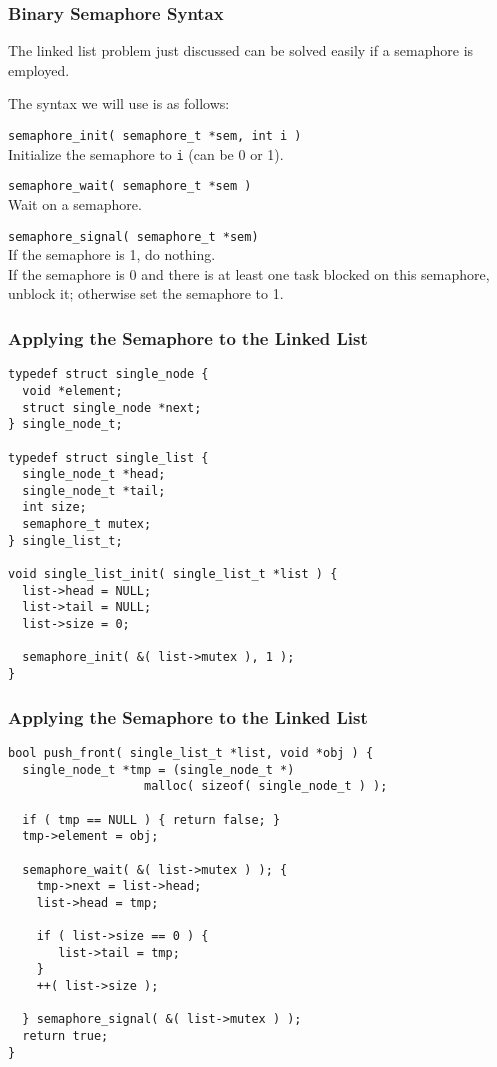 \begin{frame}
\frametitle{Binary Semaphore Syntax}

The linked list problem just discussed can be solved easily if a semaphore is employed. 

The syntax we will use is as follows:

\texttt{semaphore\_init( semaphore\_t *sem, int i )}\\
Initialize the semaphore to \texttt{i} (can be 0 or 1).

\texttt{semaphore\_wait( semaphore\_t *sem )}\\
Wait on a semaphore.

\texttt{semaphore\_signal( semaphore\_t *sem)}\\
If the semaphore is 1, do nothing.\\
If the semaphore is 0 and there is at least one task blocked on this semaphore, unblock it; otherwise set the semaphore to 1.

\end{frame}

\begin{frame}[fragile]
\frametitle{Applying the Semaphore to the Linked List}

\begin{verbatim}
typedef struct single_node {
  void *element;
  struct single_node *next;
} single_node_t;

typedef struct single_list {
  single_node_t *head;
  single_node_t *tail;
  int size;
  semaphore_t mutex;
} single_list_t;

void single_list_init( single_list_t *list ) {
  list->head = NULL;
  list->tail = NULL;
  list->size = 0;

  semaphore_init( &( list->mutex ), 1 );
}
\end{verbatim}

\end{frame}

\begin{frame}[fragile]
\frametitle{Applying the Semaphore to the Linked List}

\begin{verbatim}
bool push_front( single_list_t *list, void *obj ) {
  single_node_t *tmp = (single_node_t *) 
                   malloc( sizeof( single_node_t ) );
  
  if ( tmp == NULL ) { return false; }  
  tmp->element = obj;

  semaphore_wait( &( list->mutex ) ); {  
    tmp->next = list->head;
    list->head = tmp;

    if ( list->size == 0 ) {
       list->tail = tmp;
    }
    ++( list->size );
  
  } semaphore_signal( &( list->mutex ) );
  return true;
}
\end{verbatim}


\end{frame}

